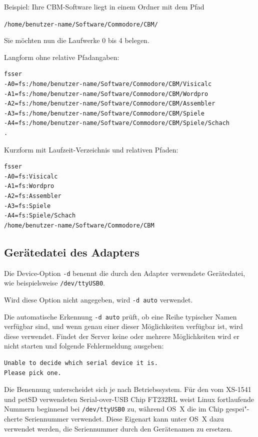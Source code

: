 \documentclass[10pt,a4paper]{scrartcl}		%
\begin{document}
Beispiel: Ihre CBM-Software liegt in einem Ordner mit dem Pfad

\texttt{/home/benutzer-name/Software/Commodore/CBM/}

Sie möchten nun die Laufwerke 0 bis 4 belegen.

Langform ohne relative Pfadangaben:

\begin{verbatim}
fsser 
-A0=fs:/home/benutzer-name/Software/Commodore/CBM/Visicalc
-A1=fs:/home/benutzer-name/Software/Commodore/CBM/Wordpro
-A2=fs:/home/benutzer-name/Software/Commodore/CBM/Assembler
-A3=fs:/home/benutzer-name/Software/Commodore/CBM/Spiele
-A4=fs:/home/benutzer-name/Software/Commodore/CBM/Spiele/Schach
.
\end{verbatim}

Kurzform mit Laufzeit-Verzeichnis und relativen Pfaden:

\begin{verbatim}
fsser 
-A0=fs:Visicalc
-A1=fs:Wordpro
-A2=fs:Assembler
-A3=fs:Spiele
-A4=fs:Spiele/Schach
/home/benutzer-name/Software/Commodore/CBM
\end{verbatim}

\subsection{Gerätedatei des Adapters}
\mbox{ }

Die Device-Option \texttt{-d} benennt die durch den
Adapter verwendete Gerätedatei, wie beispielsweise
\texttt{/dev/ttyUSB0}.

Wird diese Option nicht angegeben, wird 
\texttt{-d auto} verwendet.

Die automatische Erkennung \texttt{-d auto}
prüft, ob eine Reihe typischer Namen verfügbar sind, und wenn
genau einer dieser Möglichkeiten verfügbar ist, wird
diese verwendet. Findet der Server keine oder mehrere
Möglichkeiten wird er nicht starten und folgende Fehlermeldung
ausgeben:

\begin{verbatim}
Unable to decide which serial device it is.
Please pick one.
\end{verbatim}

Die Benennung unterscheidet sich je nach Betriebssystem.
Für den vom XS-1541 und petSD verwendeten Serial-over-USB Chip
FT232RL  weist Linux
fortlaufende Nummern beginnend bei \texttt{/dev/ttyUSB0} 
zu, während
\mbox{OS X} die im Chip gespei"-cherte Seriennummer verwendet. 
Diese Eigenart kann unter \mbox{OS X} dazu verwendet werden, die 
Seriennummer durch den Gerätenamen zu ersetzen.
\end{document}
